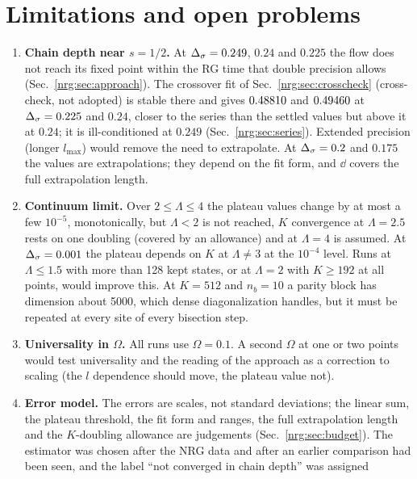 \section{Limitations and open problems}\label{nrg:sec:limits}
\begin{enumerate}
\item \textbf{Chain depth near $s=1/2$.} At $\Delta_\sigma=0.249$, $0.24$ and $0.225$ the flow does not reach its fixed point within the RG time
  that double precision allows (Sec.~\ref{nrg:sec:approach}). The crossover fit of Sec.~\ref{nrg:sec:crosscheck} (cross-check, not adopted) is
  stable there and gives $0.48810$ and $0.49460$ at $\Delta_\sigma=0.225$ and $0.24$, closer to the series than the
  settled values but above it at $0.24$; it is ill-conditioned at $0.249$ (Sec.~\ref{nrg:sec:series}). Extended precision (longer
  $l_{\max}$) would remove the need to extrapolate. At $\Delta_\sigma=0.2$ and $0.175$ the values are extrapolations; they depend on the fit
  form, and $\dd$ covers the full extrapolation length.
\item \textbf{Continuum limit.} Over $2\le\Lambda\le4$ the plateau values change by at most a few $10^{-5}$, monotonically, but
  $\Lambda<2$ is not reached, $K$ convergence at $\Lambda=2.5$ rests on one doubling (covered by an allowance) and at $\Lambda=4$ is
  assumed. At $\Delta_\sigma=0.001$ the plateau depends on $K$ at $\Lambda\neq3$ at the $10^{-4}$ level. Runs at $\Lambda\le1.5$ with more than
  128 kept states, or at $\Lambda=2$ with $K\ge192$ at all points, would improve this. At $K=512$ and $n_b=10$ a parity block has
  dimension about 5000, which dense diagonalization handles, but it must be repeated at every site of every bisection step.
\item \textbf{Universality in $\Omega$.} All runs use $\Omega=0.1$. A second $\Omega$ at one or two points would test universality and
  the reading of the approach as a correction to scaling (the $l$ dependence should move, the plateau value not).
\item \textbf{Error model.} The errors are scales, not standard deviations; the linear sum, the plateau threshold, the fit form and
  ranges, the full extrapolation length and the $K$-doubling allowance are judgements (Sec.~\ref{nrg:sec:budget}). The estimator was
  chosen after the NRG data and after an earlier comparison had been seen, and the label ``not converged in chain depth'' was assigned

\end{enumerate}
